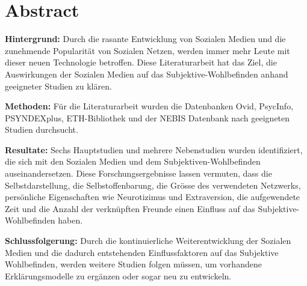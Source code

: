 %
%
\thispagestyle{empty} 
\chapter*{Abstract}\label{abstract}
\textbf{Hintergrund:} Durch die rasante Entwicklung von Sozialen Medien und die zunehmende Popularität von Sozialen Netzen, werden immer mehr Leute mit dieser neuen Technologie betroffen. Diese Literaturarbeit hat das Ziel, die Auswirkungen der Sozialen Medien auf das Subjektive-Wohlbefinden anhand geeigneter Studien zu klären. \par 
\textbf{Methoden:} Für die Literaturarbeit wurden die Datenbanken Ovid, PsycInfo, PSYNDEXplus, ETH-Bibliothek und der NEBIS Datenbank nach geeigneten Studien durchsucht.\par 
\textbf{Resultate:} Sechs Hauptstudien und mehrere Nebenstudien wurden identifiziert, die sich mit den Sozialen Medien und dem Subjektiven-Wohlbefinden auseinandersetzen. Diese Forschungsergebnisse lassen vermuten, dass die Selbstdarstellung, die Selbstoffenbarung, die Grösse des verwendeten Netzwerks, persönliche Eigenschaften wie Neurotizimus und Extraversion, die aufgewendete Zeit und die Anzahl der verknüpften Freunde einen Einfluss auf das Subjektive-Wohlbefinden haben.\par 
\textbf{Schlussfolgerung:} Durch die kontinuierliche Weiterentwicklung der Sozialen Medien und die dadurch entstehenden Einflussfaktoren auf das Subjektive Wohlbefinden, werden weitere Studien folgen müssen, um vorhandene Erklärungsmodelle zu ergänzen oder sogar neu zu entwickeln.\par 

